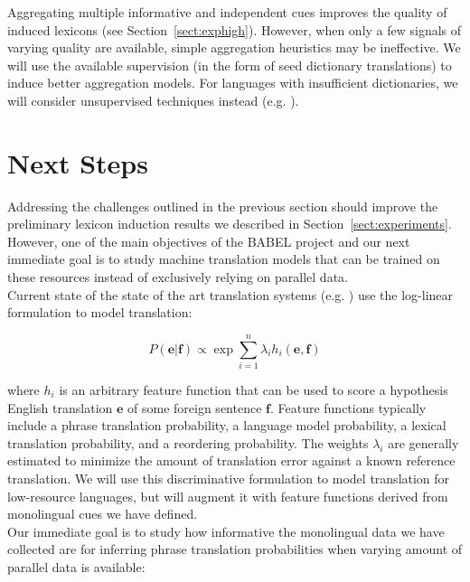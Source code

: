 \documentclass{article}
\newcommand{\secref}[1]{Section~\ref{#1}}
\begin{document}
Aggregating multiple informative and independent cues improves the quality of induced lexicons (see \secref{sect:exphigh}).  However, when only a few signals of varying quality are available, simple aggregation heuristics may be ineffective.  We will use the available supervision (in the form of seed dictionary translations) to induce better aggregation models.  For languages with insufficient dictionaries, we will consider unsupervised techniques instead (e.g. \cite{Klementiev:2006b, Klementiev:2008a}).

\section{Next Steps}

Addressing the challenges outlined in the previous section should improve the preliminary lexicon induction results we described in \secref{sect:experiments}.  However, one of the main objectives of the BABEL project and our next immediate goal is to study machine translation models that can be trained on these resources instead of exclusively relying on parallel data. \\

Current state of the state of the art translation systems (e.g. \cite{Chiang:2005}) use the log-linear formulation  \cite{Och:2002} to model translation:

\begin{equation*}
P(\mathbf{e} | \mathbf{f}) \propto \exp \sum_{i=1}^{n}{\lambda_i h_i (\mathbf{e}, \mathbf{f})} \label{log-linear-formulation}
\end{equation*}

where  $h_i$ is an arbitrary feature function that can be used to score a hypothesis English translation $\mathbf{e}$ of some foreign sentence $\mathbf{f}$.  Feature functions typically include a phrase translation probability, a language model probability, a lexical translation probability, and a reordering probability.  The weights $\lambda_i$ are generally estimated to minimize the amount of translation error against a known reference translation.  We will use this discriminative formulation to model translation for low-resource languages, but will augment it with feature functions derived from monolingual cues we have defined.  \\

Our immediate goal is to study how informative the monolingual data we have collected are for inferring phrase translation probabilities when varying amount of parallel data is available:
\end{document}
